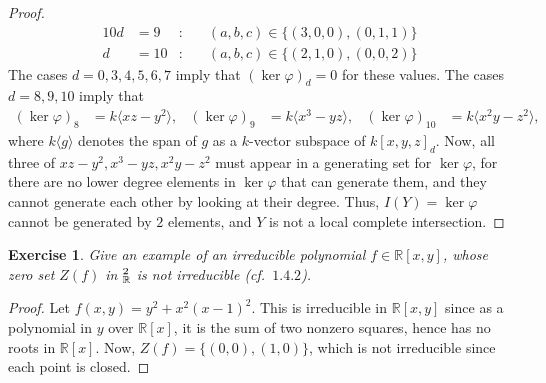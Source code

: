 \documentclass[12pt,letterpaper]{article}
\newtheorem{problem}{Exercise}[section]
\theoremstyle{definition}
\theoremstyle{remark}
\numberwithin{equation}{section}
\numberwithin{figure}{problem}
\let\AA\relax
\DeclareMathOperator{\AA}{\mathbb{A}}
\begin{document}
\begin{proof}
\begin{alignat*}{10}
    d &= 9&:& \quad (a,b,c) \in \{(3,0,0),(0,1,1)\}\\
    d &= 10&:& \quad (a,b,c) \in \{(2,1,0),(0,0,2)\}
  \end{alignat*}
  The cases $d=0,3,4,5,6,7$ imply that $(\ker \varphi)_d = 0$ for these values.
  The cases $d=8,9,10$ imply that
  \begin{align*}
    (\ker\varphi)_8 &= k\langle xz-y^2 \rangle, & (\ker\varphi)_9 &= k\langle
    x^3-yz \rangle, & (\ker\varphi)_{10} &= k\langle x^2y-z^2 \rangle,
  \end{align*}
  where $k\langle g \rangle$ denotes the span of $g$ as a $k$-vector subspace of
  $k[x,y,z]_d$.
  Now, all three of $xz-y^2,x^3-yz,x^2y - z^2$ must appear in a generating set for
  $\ker\varphi$, for there are no lower degree elements in $\ker\varphi$ that
  can generate them, and they cannot generate each other by looking at their
  degree.
  Thus, $I(Y) = \ker\varphi$ cannot be generated by $2$ elements, and $Y$ is not
  a local complete intersection.
\end{proof}

\begin{problem}
  Give an example of an irreducible polynomial $f \in \mathbb{R}[x,y]$,
  whose zero set $Z(f)$ in $\AA_{\mathbb{R}}^2$ is not irreducible
  \emph{(cf.~$1.4.2$)}.
\end{problem}
\begin{proof}
  Let $f(x,y) = y^2 + x^2(x-1)^2$. This is irreducible in $\mathbb{R}[x,y]$
  since as a polynomial in $y$ over $\mathbb{R}[x]$, it is the sum of two
  nonzero squares, hence has no roots in $\mathbb{R}[x]$. Now, $Z(f) =
  \{(0,0),(1,0)\}$, which is not irreducible since each point is closed.
\end{proof}

\printbibliography
\end{document}
